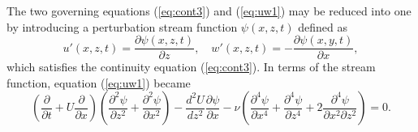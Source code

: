 The two governing equations (\ref{eq:cont3}) and (\ref{eq:uw1}) may be reduced into one by introducing a perturbation stream function $\psi ( x,z,t)$ defined as
\begin{equation}
u'( x,z,t) =\frac{\partial \psi ( x,z,t)}{\partial z},\quad w'( x,z,t) =-\frac{\partial \psi ( x,y,t)}{\partial x},
\end{equation}
which satisfies the continuity equation (\ref{eq:cont3}). In terms of the stream function, equation (\ref{eq:uw1}) became
\begin{equation}
    \left(\frac{\partial }{\partial t} +U\frac{\partial }{\partial x}\right)\left(\frac{\partial ^{2} \psi }{\partial z^{2}} +\frac{\partial ^{2} \psi }{\partial x^{2}}\right)-\frac{d^{2} U}{dz^{2}}\frac{\partial \psi }{\partial x} -\nu \left(\frac{\partial ^{4} \psi }{\partial x^{4}} +\frac{\partial ^{4} \psi }{\partial z^{4}} +2\frac{\partial ^{4} \psi }{\partial x^{2} \partial z^{2}}\right) =0.
    \label{eq:gov1}
\end{equation}

